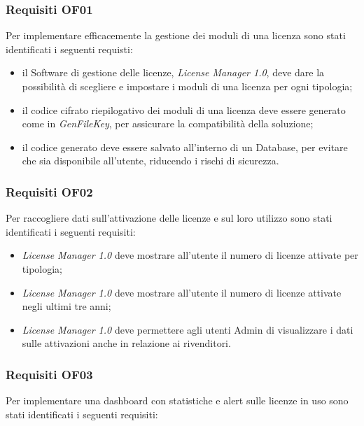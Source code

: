 \subsubsection{Requisiti OF01}

Per implementare efficacemente la gestione dei moduli di una licenza sono stati identificati i seguenti requisti:

\begin{itemize}
\item il Software di gestione delle licenze, \textit{License Manager 1.0}, deve dare la possibilità di scegliere e impostare i moduli di una licenza per ogni tipologia;
\item il codice cifrato riepilogativo dei moduli di una licenza deve essere generato come in \textit{GenFileKey}, per assicurare la compatibilità della soluzione;
\item il codice generato deve essere salvato all'interno di un Database, per evitare che sia disponibile all'utente, riducendo i rischi di sicurezza.

\end{itemize}

\subsubsection{Requisiti OF02}

Per raccogliere dati sull'attivazione delle licenze e sul loro utilizzo sono stati identificati i seguenti requisiti:

\begin{itemize}
\item \textit{License Manager 1.0} deve mostrare all'utente il numero di licenze attivate per tipologia;
\item \textit{License Manager 1.0} deve mostrare all'utente il numero di licenze attivate negli ultimi tre anni;
\item \textit{License Manager 1.0} deve permettere agli utenti Admin di visualizzare i dati sulle attivazioni anche in relazione ai rivenditori.
\end{itemize}


\subsubsection{Requisiti OF03}

Per implementare una dashboard con statistiche e alert sulle licenze in uso sono stati identificati i seguenti requisiti:

